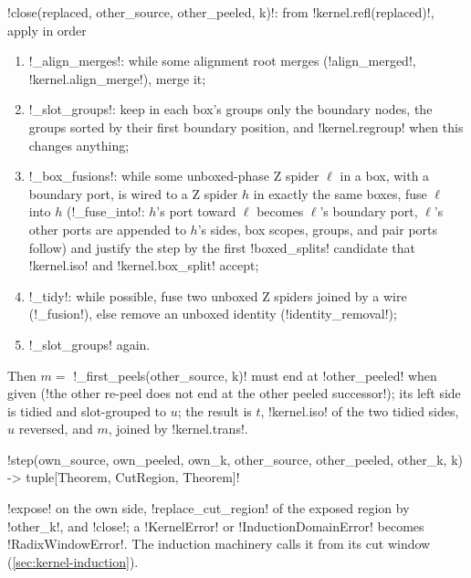 \begin{algorithm}[Closing]\label{alg:kernel-radix-close}
\py!close(replaced, other_source, other_peeled, k)!: from \py!kernel.refl(replaced)!, apply in order
\begin{enumerate}
\item \py!_align_merges!: while some alignment root merges (\py!align_merged!, \py!kernel.align_merge!), merge it;
\item \py!_slot_groups!: keep in each box's groups only the boundary nodes, the groups sorted by their first boundary position, and \py!kernel.regroup! when this changes anything;
\item \py!_box_fusions!: while some unboxed-phase Z spider $\ell$ in a box, with a boundary port, is wired to a Z spider $h$ in exactly the same boxes, fuse $\ell$ into $h$ (\py!_fuse_into!: $h$'s port toward $\ell$ becomes $\ell$'s boundary port, $\ell$'s other ports are appended to $h$'s sides, box scopes, groups, and pair ports follow) and justify the step by the first \py!boxed_splits! candidate that \py!kernel.iso! and \py!kernel.box_split! accept;
\item \py!_tidy!: while possible, fuse two unboxed Z spiders joined by a wire (\py!_fusion!), else remove an unboxed identity (\code!identity_removal!);
\item \py!_slot_groups! again.
\end{enumerate}
Then $m=$ \py!_first_peels(other_source, k)! must end at \py!other_peeled! when given (\code!the other re-peel does not end at the other peeled successor!); its left side is tidied and slot-grouped to $u$; the result is $t$, \py!kernel.iso! of the two tidied sides, $u$ reversed, and $m$, joined by \py!kernel.trans!.
\end{algorithm}

\begin{signature}
\py!step(own_source, own_peeled, own_k, other_source, other_peeled, other_k, k) -> tuple[Theorem, CutRegion, Theorem]!
\end{signature}
\noindent \py!expose! on the own side, \py!replace_cut_region! of the exposed region by \py!other_k!, and \py!close!; a \py!KernelError! or \py!InductionDomainError! becomes \py!RadixWindowError!. The induction machinery calls it from its cut window (\cref{sec:kernel-induction}).

